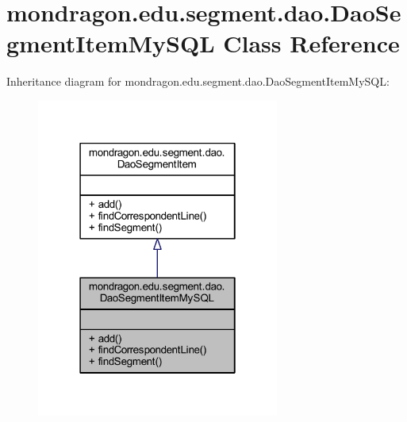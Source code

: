 \hypertarget{classmondragon_1_1edu_1_1segment_1_1dao_1_1_dao_segment_item_my_s_q_l}{}\section{mondragon.\+edu.\+segment.\+dao.\+Dao\+Segment\+Item\+My\+S\+QL Class Reference}
\label{classmondragon_1_1edu_1_1segment_1_1dao_1_1_dao_segment_item_my_s_q_l}


Inheritance diagram for mondragon.\+edu.\+segment.\+dao.\+Dao\+Segment\+Item\+My\+S\+QL\+:\nopagebreak
\begin{figure}[H]
\begin{center}
\leavevmode
\includegraphics[width=226pt]{classmondragon_1_1edu_1_1segment_1_1dao_1_1_dao_segment_item_my_s_q_l__inherit__graph}
\end{center}
\end{figure}


